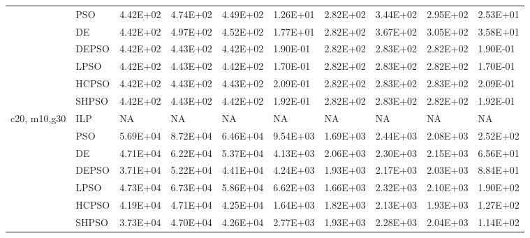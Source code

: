 \begin{adjustbox}{angle=90}
\begin{tabular}{@{}llllllllll@{}}
 & PSO & 4.42E+02 & 4.74E+02 & 4.49E+02 & 1.26E+01 & 2.82E+02 & 3.44E+02 & 2.95E+02 & 2.53E+01 \\
 & DE & 4.42E+02 & 4.97E+02 & 4.52E+02 & 1.77E+01 & 2.82E+02 & 3.67E+02 & 3.05E+02 & 3.58E+01 \\
 & DEPSO & 4.42E+02 & 4.43E+02 & 4.42E+02 & 1.90E-01 & 2.82E+02 & 2.83E+02 & 2.82E+02 & 1.90E-01 \\
 & LPSO & 4.42E+02 & 4.43E+02 & 4.42E+02 & 1.70E-01 & 2.82E+02 & 2.83E+02 & 2.82E+02 & 1.70E-01 \\
 & HCPSO & 4.42E+02 & 4.43E+02 & 4.43E+02 & 2.09E-01 & 2.82E+02 & 2.83E+02 & 2.83E+02 & 2.09E-01 \\
 & SHPSO & 4.42E+02 & 4.43E+02 & 4.42E+02 & 1.92E-01 & 2.82E+02 & 2.83E+02 & 2.82E+02 & 1.92E-01 \\
c20, m10,g30 & ILP & NA & NA & NA & NA & NA & NA & NA & NA \\
 & PSO & 5.69E+04 & 8.72E+04 & 6.46E+04 & 9.54E+03 & 1.69E+03 & 2.44E+03 & 2.08E+03 & 2.52E+02 \\
 & DE & 4.71E+04 & 6.22E+04 & 5.37E+04 & 4.13E+03 & 2.06E+03 & 2.30E+03 & 2.15E+03 & 6.56E+01 \\
 & DEPSO & 3.71E+04 & 5.22E+04 & 4.41E+04 & 4.24E+03 & 1.93E+03 & 2.17E+03 & 2.03E+03 & 8.84E+01 \\
 & LPSO & 4.73E+04 & 6.73E+04 & 5.86E+04 & 6.62E+03 & 1.66E+03 & 2.32E+03 & 2.10E+03 & 1.90E+02 \\
 & HCPSO & 4.19E+04 & 4.71E+04 & 4.25E+04 & 1.64E+03 & 1.82E+03 & 2.13E+03 & 1.93E+03 & 1.27E+02 \\
 & SHPSO & 3.73E+04 & 4.70E+04 & 4.26E+04 & 2.77E+03 & 1.93E+03 & 2.28E+03 & 2.04E+03 & 1.14E+02 \\ \bottomrule
\end{tabular}
\end{adjustbox}

